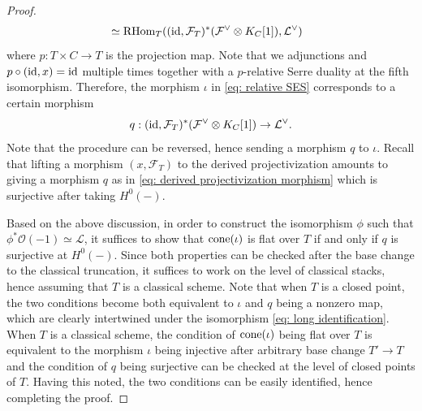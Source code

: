 \documentclass[10pt]{amsart}
\newcommand{\CO}{\mathcal{O}}
\newcommand{\CL}{\mathcal{L}}
\newcommand{\CF}{\mathcal{F}}
\newcommand{\RHom}{\textnormal{RHom}}
\newcommand{\cone}{\textnormal{cone}}
\newcommand{\id}{\textnormal{id}}
\newcommand{\+}{{}^+}
\theoremstyle{definition}
\theoremstyle {definition}
\theoremstyle {definition}
\begin{document}
\begin{proof}
\begin{equation}
\begin{aligned}
        &\simeq \RHom_T((\id,\CF_T)^*(\CF^\vee\otimes K_C[1]), \CL^\vee)
    \end{aligned}
    \end{equation}
    where $p:T\times C\rightarrow T$ is the projection map. Note that we adjunctions and $p\circ (\id,x)=\id$ multiple times together with a $p$-relative Serre duality at the fifth isomorphism. Therefore, the morphism $\iota$ in \eqref{eq: relative SES} corresponds to a certain morphism 
    \begin{equation}\label{eq: derived projectivization morphism}
        q:(\id,\CF_T)^*(\CF^\vee\otimes K_C[1])\rightarrow \CL^\vee.
    \end{equation}
    Note that the procedure can be reversed, hence sending a morphism $q$ to $\iota$. Recall that lifting a morphism $(x,\CF_T)$ to the derived projectivization amounts to giving a morphism $q$ as in \eqref{eq: derived projectivization morphism} which is surjective after taking $H^0(-)$. 

    Based on the above discussion, in order to construct the isomorphism $\phi$ such that $\phi^*\CO(-1)\simeq \CL$, it suffices to show that $\cone(\iota)$ is flat over $T$ if and only if $q$ is surjective at $H^0(-)$. Since both properties can be checked after the base change to the classical truncation, it suffices to work on the level of classical stacks, hence assuming that $T$ is a classical scheme. Note that when $T$ is a closed point, the two conditions become both equivalent to $\iota$ and $q$ being a nonzero map, which are clearly intertwined under the isomorphism \eqref{eq: long identification}. When $T$ is a classical scheme, the condition of $\cone(\iota)$ being flat over $T$ is equivalent to the morphism $\iota$ being injective after arbitrary base change $T'\rightarrow T$ and the condition of $q$ being surjective can be checked at the level of closed points of $T$. Having this noted, the two conditions can be easily identified, hence completing the proof. 
    
\end{proof}
\end{document}

